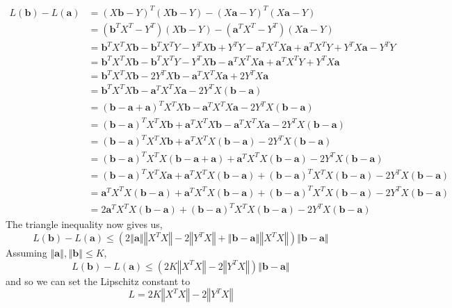 \documentclass{article}
\begin{document}
\[
    \begin{aligned}
			L(\textbf{b}) - L(\textbf{a}) &= (X\textbf{b} - Y)^T (X\textbf{b} - Y) - (X\textbf{a} - Y)^T (X\textbf{a} - Y) \\
			&= (\textbf{b}^T X^T - Y^T)(X\textbf{b} - Y) - (\textbf{a}^T X^T - Y^T)(X\textbf{a} - Y) \\
			&= \textbf{b}^T X^T X \textbf{b} - \textbf{b}^T X^T Y - Y^T X\textbf{b} + Y^T Y - \textbf{a}^T X^T X\textbf{a} + \textbf{a}^T X^T Y + Y^T X\textbf{a} - Y^T Y \\
			&= \textbf{b}^T X^T X \textbf{b} - \textbf{b}^T X^T Y - Y^T X\textbf{b} - \textbf{a}^T X^T X\textbf{a} + \textbf{a}^T X^T Y + Y^T X\textbf{a} \\
			&= \textbf{b}^T X^T X \textbf{b} - 2Y^T X\textbf{b} - \textbf{a}^T X^T X\textbf{a} + 2Y^T X\textbf{a} \\
			&= \textbf{b}^T X^T X \textbf{b} - \textbf{a}^T X^T X\textbf{a} - 2Y^T X(\textbf{b} - \textbf{a}) \\
			&= (\textbf{b} - \textbf{a} + \textbf{a})^T X^T X \textbf{b} - \textbf{a}^T X^T X\textbf{a} - 2Y^T X(\textbf{b} - \textbf{a}) \\
			&= (\textbf{b} - \textbf{a})^T X^T X \textbf{b} + \textbf{a}^T X^T X \textbf{b} - \textbf{a}^T X^T X\textbf{a} - 2Y^T X(\textbf{b} - \textbf{a}) \\
			&= (\textbf{b} - \textbf{a})^T X^T X \textbf{b} + \textbf{a}^T X^T X (\textbf{b} - \textbf{a}) - 2Y^T X(\textbf{b} - \textbf{a}) \\
			&= (\textbf{b} - \textbf{a})^T X^T X (\textbf{b} - \textbf{a} + \textbf{a}) + \textbf{a}^T X^T X (\textbf{b} - \textbf{a}) - 2Y^T X(\textbf{b} - \textbf{a}) \\
			&= (\textbf{b} - \textbf{a})^T X^T X\textbf{a} + \textbf{a}^T X^T X(\textbf{b} - \textbf{a}) + (\textbf{b} - \textbf{a})^T X^T X(\textbf{b} - \textbf{a}) - 2Y^T X(\textbf{b} - \textbf{a}) \\
			&= \textbf{a}^T X^T X (\textbf{b} - \textbf{a}) + \textbf{a}^T X^T X(\textbf{b} - \textbf{a}) + (\textbf{b} - \textbf{a})^T X^T X(\textbf{b} - \textbf{a}) - 2Y^T X(\textbf{b} - \textbf{a}) \\
			&= 2\textbf{a}^T X^T X(\textbf{b} - \textbf{a}) + (\textbf{b} - \textbf{a})^T X^T X(\textbf{b} - \textbf{a}) - 2Y^T X(\textbf{b} - \textbf{a})
		\end{aligned}
\]
The triangle inequality now gives us,
\[
    L(\textbf{b}) - L(\textbf{a}) \leq \left( 2 \left\Vert \textbf{a} \right\Vert \left\Vert X^T X \right\Vert - 2\left\Vert Y^T X \right\Vert + \left\Vert \textbf{b} - \textbf{a} \right\Vert \left\Vert X^T X \right\Vert \right)\left\Vert \textbf{b} - \textbf{a} \right\Vert
\]
Assuming $\left\Vert \textbf{a} \right\Vert, \left\Vert \textbf{b} \right\Vert \leq K$,
\[
    L(\textbf{b}) - L(\textbf{a}) \leq \left( 2K \left\Vert X^T X \right\Vert - 2 \left\Vert Y^T X \right\Vert \right) \left\Vert \textbf{b} - \textbf{a} \right\Vert
\]
and so we can set the Lipschitz constant to
\[
    \boxed{
        L = 2K \left\Vert X^T X \right\Vert - 2 \left\Vert Y^T X \right\Vert
    }
\]
\end{document}
